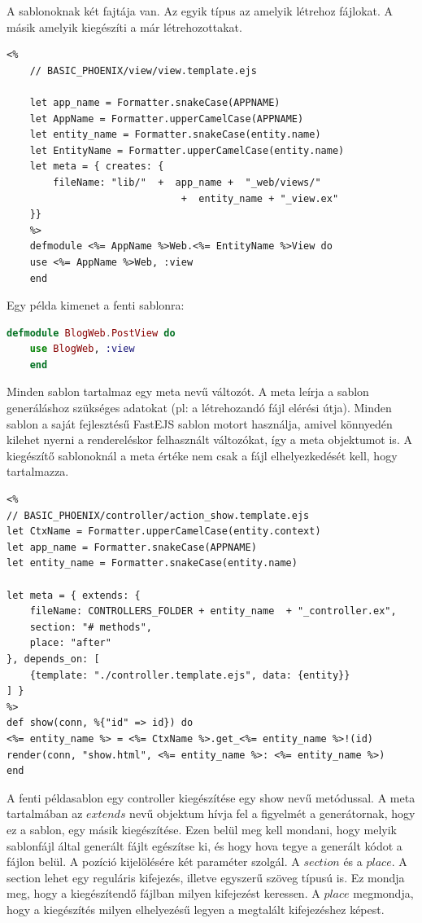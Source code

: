 \documentclass[a4paper,12pt,oneside]{report}
\begin{document}
\begin{justify}

	A sablonoknak két fajtája van. Az egyik típus az amelyik létrehoz fájlokat. A másik amelyik kiegészíti a már létrehozottakat.

	\begin{lstlisting}[language=ejs]
	<%
	// BASIC_PHOENIX/view/view.template.ejs

	let app_name = Formatter.snakeCase(APPNAME)
	let AppName = Formatter.upperCamelCase(APPNAME)
	let entity_name = Formatter.snakeCase(entity.name)
	let EntityName = Formatter.upperCamelCase(entity.name)
	let meta = { creates: {
        fileName: "lib/"  +  app_name +  "_web/views/" 
                              +  entity_name + "_view.ex"
	}}
	%>
	defmodule <%= AppName %>Web.<%= EntityName %>View do
	use <%= AppName %>Web, :view
	end
	\end{lstlisting}

	Egy példa kimenet a fenti sablonra: 

	\begin{lstlisting}[language=elixir]
	defmodule BlogWeb.PostView do
	use BlogWeb, :view
	end
	\end{lstlisting}

	Minden sablon tartalmaz egy meta nevű változót. A meta leírja a sablon generáláshoz szükséges adatokat (pl: a létrehozandó fájl elérési útja). Minden sablon a saját fejlesztésű FastEJS sablon motort használja, amivel könnyedén kilehet nyerni a rendereléskor felhasznált változókat, így a meta objektumot is. 
    \newpage
	A kiegészítő sablonoknál a meta értéke nem csak a fájl elhelyezkedését kell, hogy tartalmazza.

	\begin{lstlisting}[language=ejs]
<%
// BASIC_PHOENIX/controller/action_show.template.ejs 
let CtxName = Formatter.upperCamelCase(entity.context)
let app_name = Formatter.snakeCase(APPNAME)
let entity_name = Formatter.snakeCase(entity.name)

let meta = { extends: {
	fileName: CONTROLLERS_FOLDER + entity_name  + "_controller.ex",
	section: "# methods",
	place: "after"
}, depends_on: [
    {template: "./controller.template.ejs", data: {entity}}
] }
%> 
def show(conn, %{"id" => id}) do
<%= entity_name %> = <%= CtxName %>.get_<%= entity_name %>!(id)
render(conn, "show.html", <%= entity_name %>: <%= entity_name %>)
end
	\end{lstlisting}

	A fenti példasablon egy controller kiegészítése egy show nevű metódussal. A meta tartalmában az $extends$ nevű objektum hívja fel a figyelmét a generátornak, hogy ez a sablon, egy másik kiegészítése. Ezen belül meg kell mondani, hogy melyik sablonfájl által generált fájlt egészítse ki, és hogy hova tegye a generált kódot a fájlon belül. A pozíció kijelölésére két paraméter szolgál. A $section$ és a $place$. A section lehet egy reguláris kifejezés, illetve egyszerű szöveg típusú is. Ez mondja meg, hogy a kiegészítendő fájlban milyen kifejezést keressen. A $place$ megmondja, hogy a kiegészítés milyen elhelyezésű legyen a megtalált kifejezéshez képest.


\end{justify}
\end{document}
